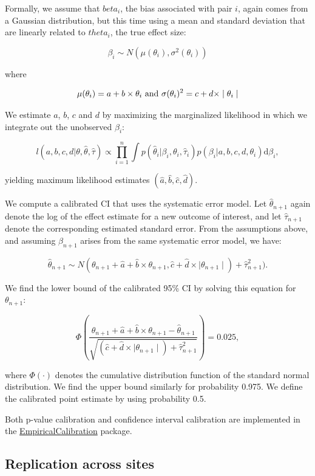 \documentclass[11pt]{book}
\theoremstyle{definition}
\theoremstyle{definition}
\theoremstyle{definition}
\theoremstyle{remark}
\begin{document}
Formally, we assume that \(beta_i\), the bias associated with pair \(i\), again comes from a Gaussian distribution, but this time using a mean and standard deviation that are linearly related to \(theta_i\), the true effect size:

\[\beta_i \sim N(\mu(\theta_i) , \sigma^2(\theta_i))\]

where

\[\mu(\theta_i) = a + b \times \theta_i \text{ and } \\
  \sigma(\theta_i) ^2= c + d \times \mid \theta_i \mid\]

We estimate \(a\), \(b\), \(c\) and \(d\) by maximizing the marginalized likelihood in which we integrate out the unobserved \(\beta_i\):

\[l(a,b,c,d | \theta, \hat{\theta}, \hat{\tau} ) \propto \prod_{i=1}^{n}\int p(\hat{\theta}_i|\beta_i, \theta_i, \hat{\tau}_i)p(\beta_i|a,b,c,d,\theta_i) \text{d}\beta_i ,\]

yielding maximum likelihood estimates \((\hat{a}, \hat{b}, \hat{c}, \hat{d})\).

We compute a calibrated CI that uses the systematic error model. Let \(\hat{\theta}_{n+1}\) again denote the log of the effect estimate for a new outcome of interest, and let \(\hat{\tau}_{n+1}\) denote the corresponding estimated standard error. From the assumptions above, and assuming \(\beta_{n+1}\) arises from the same systematic error model, we have:

\[\hat{\theta}_{n+1} \sim N(
\theta_{n+1} + \hat{a} + \hat{b} \times \theta_{n+1},
\hat{c} + \hat{d} \times \mid \theta_{n+1} \mid) + \hat{\tau}_{n+1}^2) .\]

We find the lower bound of the calibrated 95\% CI by solving this equation for \(\theta_{n+1}\):

\[\Phi\left(
\frac{\theta_{n+1} + \hat{a} + \hat{b} \times \theta_{n+1}-\hat{\theta}_{n+1}}
{\sqrt{(\hat{c} + \hat{d} \times \mid \theta_{n+1} \mid) + \hat{\tau}_{n+1}^2}}
\right) = 0.025 ,\]

where \(\Phi(\cdot)\) denotes the cumulative distribution function of the standard normal distribution. We find the upper bound similarly for probability 0.975. We define the calibrated point estimate by using probability 0.5.

Both p-value calibration and confidence interval calibration are implemented in the \href{https://ohdsi.github.io/EmpiricalCalibration/}{EmpiricalCalibration} package.

\hypertarget{replication-across-sites}{%
\subsection{Replication across sites}\label{replication-across-sites}}
\end{document}
